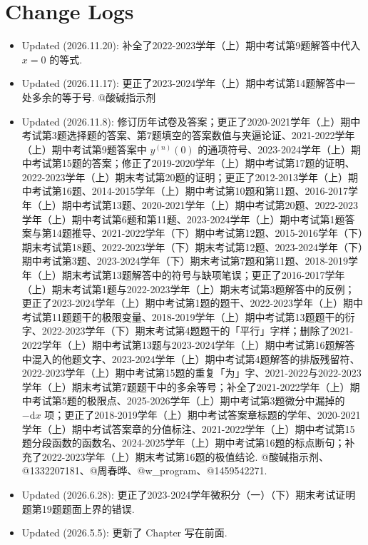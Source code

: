 \documentclass[../main.tex]{subfiles}
\begin{document}
\section*{Change Logs}

\begin{itemize}
    \item Updated (2026.11.20): 补全了2022-2023学年（上）期中考试第9题解答中代入 $x=0$ 的等式.
    \item Updated (2026.11.17): 更正了2023-2024学年（上）期中考试第14题解答中一处多余的等于号. {\kaishu @酸碱指示剂}
    \item Updated (2026.11.8): 修订历年试卷及答案；更正了2020-2021学年（上）期中考试第3题选择题的答案、第7题填空的答案数值与夹逼论证、2021-2022学年（上）期中考试第9题答案中 $y^{(n)}(0)$ 的通项符号、2023-2024学年（上）期中考试第15题的答案；修正了2019-2020学年（上）期中考试第17题的证明、2022-2023学年（上）期末考试第20题的证明；更正了2012-2013学年（上）期中考试第16题、2014-2015学年（上）期中考试第10题和第11题、2016-2017学年（上）期中考试第13题、2020-2021学年（上）期中考试第20题、2022-2023学年（上）期中考试第6题和第11题、2023-2024学年（上）期中考试第1题答案与第14题推导、2021-2022学年（下）期中考试第12题、2015-2016学年（下）期末考试第18题、2022-2023学年（下）期末考试第12题、2023-2024学年（下）期中考试第3题、2023-2024学年（下）期末考试第7题和第11题、2018-2019学年（上）期末考试第13题解答中的符号与缺项笔误；更正了2016-2017学年（上）期末考试第1题与2022-2023学年（上）期末考试第3题解答中的反例；更正了2023-2024学年（上）期中考试第1题的题干、2022-2023学年（上）期中考试第11题题干的极限变量、2018-2019学年（上）期中考试第13题题干的衍字、2022-2023学年（下）期末考试第4题题干的「平行」字样；删除了2021-2022学年（上）期中考试第13题与2023-2024学年（上）期中考试第16题解答中混入的他题文字、2023-2024学年（上）期中考试第4题解答的排版残留符、2022-2023学年（上）期中考试第15题的重复「为」字、2021-2022与2022-2023学年（上）期末考试第7题题干中的多余等号；补全了2021-2022学年（上）期中考试第5题的极限点、2025-2026学年（上）期中考试第3题微分中漏掉的 $-\mathrm{d}x$ 项；更正了2018-2019学年（上）期中考试答案章标题的学年、2020-2021学年（上）期中考试答案章的分值标注、2021-2022学年（上）期中考试第15题分段函数的函数名、2024-2025学年（上）期中考试第16题的标点断句；补充了2022-2023学年（上）期末考试第16题的极值结论. {\kaishu @酸碱指示剂}、{\kaishu @1332207181}、{\kaishu @周春晔}、{\kaishu @w\_program}、{\kaishu @1459542271}.
    \item Updated (2026.6.28): 更正了2023-2024学年微积分（一）（下）期末考试证明题第19题题面上界的错误.
    \item Updated (2026.5.5): 更新了 Chapter 写在前面.
\end{itemize}
\end{document}

